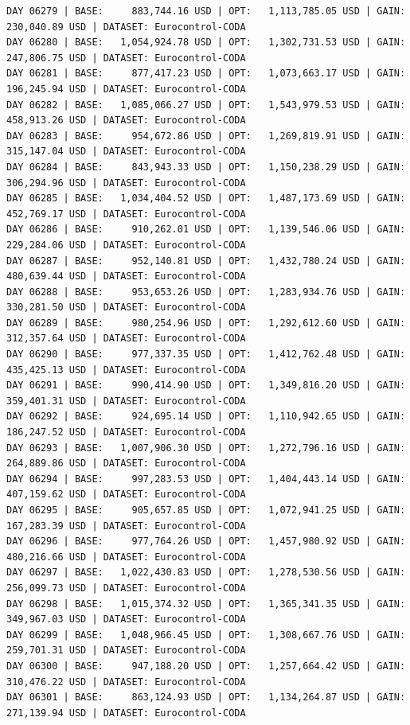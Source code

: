 \documentclass[11pt,a4paper]{article}
\begin{document}
\begin{verbatim}
DAY 06279 | BASE:     883,744.16 USD | OPT:   1,113,785.05 USD | GAIN: 230,040.89 USD | DATASET: Eurocontrol-CODA
DAY 06280 | BASE:   1,054,924.78 USD | OPT:   1,302,731.53 USD | GAIN: 247,806.75 USD | DATASET: Eurocontrol-CODA
DAY 06281 | BASE:     877,417.23 USD | OPT:   1,073,663.17 USD | GAIN: 196,245.94 USD | DATASET: Eurocontrol-CODA
DAY 06282 | BASE:   1,085,066.27 USD | OPT:   1,543,979.53 USD | GAIN: 458,913.26 USD | DATASET: Eurocontrol-CODA
DAY 06283 | BASE:     954,672.86 USD | OPT:   1,269,819.91 USD | GAIN: 315,147.04 USD | DATASET: Eurocontrol-CODA
DAY 06284 | BASE:     843,943.33 USD | OPT:   1,150,238.29 USD | GAIN: 306,294.96 USD | DATASET: Eurocontrol-CODA
DAY 06285 | BASE:   1,034,404.52 USD | OPT:   1,487,173.69 USD | GAIN: 452,769.17 USD | DATASET: Eurocontrol-CODA
DAY 06286 | BASE:     910,262.01 USD | OPT:   1,139,546.06 USD | GAIN: 229,284.06 USD | DATASET: Eurocontrol-CODA
DAY 06287 | BASE:     952,140.81 USD | OPT:   1,432,780.24 USD | GAIN: 480,639.44 USD | DATASET: Eurocontrol-CODA
DAY 06288 | BASE:     953,653.26 USD | OPT:   1,283,934.76 USD | GAIN: 330,281.50 USD | DATASET: Eurocontrol-CODA
DAY 06289 | BASE:     980,254.96 USD | OPT:   1,292,612.60 USD | GAIN: 312,357.64 USD | DATASET: Eurocontrol-CODA
DAY 06290 | BASE:     977,337.35 USD | OPT:   1,412,762.48 USD | GAIN: 435,425.13 USD | DATASET: Eurocontrol-CODA
DAY 06291 | BASE:     990,414.90 USD | OPT:   1,349,816.20 USD | GAIN: 359,401.31 USD | DATASET: Eurocontrol-CODA
DAY 06292 | BASE:     924,695.14 USD | OPT:   1,110,942.65 USD | GAIN: 186,247.52 USD | DATASET: Eurocontrol-CODA
DAY 06293 | BASE:   1,007,906.30 USD | OPT:   1,272,796.16 USD | GAIN: 264,889.86 USD | DATASET: Eurocontrol-CODA
DAY 06294 | BASE:     997,283.53 USD | OPT:   1,404,443.14 USD | GAIN: 407,159.62 USD | DATASET: Eurocontrol-CODA
DAY 06295 | BASE:     905,657.85 USD | OPT:   1,072,941.25 USD | GAIN: 167,283.39 USD | DATASET: Eurocontrol-CODA
DAY 06296 | BASE:     977,764.26 USD | OPT:   1,457,980.92 USD | GAIN: 480,216.66 USD | DATASET: Eurocontrol-CODA
DAY 06297 | BASE:   1,022,430.83 USD | OPT:   1,278,530.56 USD | GAIN: 256,099.73 USD | DATASET: Eurocontrol-CODA
DAY 06298 | BASE:   1,015,374.32 USD | OPT:   1,365,341.35 USD | GAIN: 349,967.03 USD | DATASET: Eurocontrol-CODA
DAY 06299 | BASE:   1,048,966.45 USD | OPT:   1,308,667.76 USD | GAIN: 259,701.31 USD | DATASET: Eurocontrol-CODA
DAY 06300 | BASE:     947,188.20 USD | OPT:   1,257,664.42 USD | GAIN: 310,476.22 USD | DATASET: Eurocontrol-CODA
DAY 06301 | BASE:     863,124.93 USD | OPT:   1,134,264.87 USD | GAIN: 271,139.94 USD | DATASET: Eurocontrol-CODA

\end{verbatim}
\end{document}
